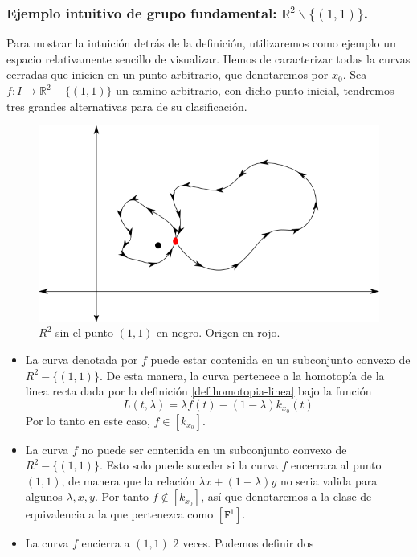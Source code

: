 {\subsubsection{Ejemplo intuitivo de grupo fundamental: \(\mathbb{R}^2 \backslash
  \{(1,1)\}\).} \label{ex:R2-11}
Para mostrar la intuición detrás de la definición, utilizaremos como
ejemplo un espacio relativamente sencillo de visualizar. Hemos de
caracterizar todas la curvas cerradas que inicien en un punto
arbitrario, que denotaremos por \(x_0\). Sea \(f : I \to \mathbb{R}^2 -
\{(1,1)\}\) un camino arbitrario, con dicho punto inicial, tendremos
tres grandes alternativas para de su clasificación.
\begin{figure}[h]
  \centering
  \includegraphics[scale=0.5]{./imagenes/R2-punto.png}
  \caption{\(R^2\) sin el punto \((1,1)\) en negro. Origen en rojo. }
  \label{fig:R2-sin-punto}
\end{figure}
\begin{itemize}
\item La curva denotada por \(f\) puede estar contenida en un subconjunto
  convexo de \(R^2 - \{(1,1)\}\). De esta manera, la curva pertenece a la
  homotopía de la linea recta dada por la definición
  \ref{def:homotopia-linea} bajo la función
  \[ L (t,\lambda) = \lambda f (t) - (1 - \lambda) k_{x_0} (t)\]
  Por lo tanto en este caso, \(f \in [k_{x_0}]\).
\item La curva \(f\) no puede ser contenida en un subconjunto convexo de
  \(R^2 - \{ (1,1)\}\). Esto solo puede suceder si la curva \(f\)
  encerrara al punto \((1,1)\), de manera que la relación \(\lambda x +
  (1 - \lambda) y\) no seria valida para algunos \(\lambda, x, y\). Por
  tanto \(f \not \in [k_{x_0}]\), así que denotaremos a la clase de
  equivalencia a la que pertenezca como \([\mathtt{F}^1]\).
\item La curva \(f\) encierra a \((1,1)\) \(2\) veces. Podemos definir dos

\end{itemize}}
